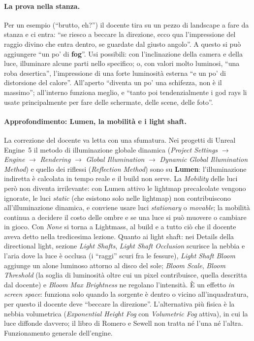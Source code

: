 \paragraph{La prova nella stanza.} Per un esempio (``brutto, eh?'') il docente tira su un pezzo
di landscape a fare da stanza e ci entra: ``se riesco a beccare la direzione, ecco qua
l'impressione del raggio divino che entra dentro, se guardate dal giusto angolo''. A questo si
può aggiungere ``un po' di \textbf{fog}''. Usi possibili: con l'inclinazione della camera e
della luce, illuminare alcune parti nello specifico; o, con valori molto luminosi, ``una roba
desertica'', l'impressione di una forte luminosità esterna ``e un po' di distorsione del
calore''. All'aperto ``diventa un po' una schifezza, non è il massimo''; all'interno funziona
meglio, e ``tanto poi tendenzialmente i god rays li usate principalmente per fare delle
schermate, delle scene, delle foto''.

\paragraph{Approfondimento: Lumen, la mobilità e i light shaft.} La correzione del docente va
letta con una sfumatura. Nei progetti di Unreal Engine~5 il metodo di illuminazione globale
dinamica (\emph{Project Settings} $\rightarrow$ \emph{Engine} $\rightarrow$
\emph{Rendering} $\rightarrow$ \emph{Global Illumination} $\rightarrow$ \emph{Dynamic Global
Illumination Method}) e quello dei riflessi (\emph{Reflection Method}) sono su
\textbf{Lumen}: l'illuminazione indiretta è calcolata in tempo reale e il build non serve.
La \emph{Mobility} delle luci però non diventa irrilevante: con Lumen attivo le lightmap
precalcolate vengono ignorate, le luci \emph{static} (che esistono solo nelle lightmap)
non contribuiscono all'illuminazione dinamica, e conviene usare luci \emph{stationary} o
\emph{movable}; la mobilità continua a decidere il costo delle ombre e se una luce si può
muovere o cambiare in gioco. Con \emph{None} si torna a Lightmass, al build e a tutto ciò che
il docente aveva detto nella tredicesima lezione. Quanto ai light shaft: nei Details della
directional light, sezione \emph{Light Shafts}, \emph{Light Shaft Occlusion} scurisce la
nebbia e l'aria dove la luce è occlusa (i ``raggi'' scuri fra le fessure), \emph{Light Shaft
Bloom} aggiunge un alone luminoso attorno al disco del sole; \emph{Bloom Scale},
\emph{Bloom Threshold} (la soglia di luminosità oltre cui un pixel contribuisce, quella
descritta dal docente) e \emph{Bloom Max Brightness} ne regolano l'intensità. È un effetto
\emph{in screen space}: funziona solo quando la sorgente è dentro o vicino all'inquadratura,
per questo il docente deve ``beccare la direzione''. L'alternativa più fisica è la nebbia
volumetrica (\emph{Exponential Height Fog} con \emph{Volumetric Fog} attiva), in cui la luce
diffonde davvero; il libro di Romero e Sewell non tratta né l'una né l'altra. Funzionamento
generale dell'engine.

